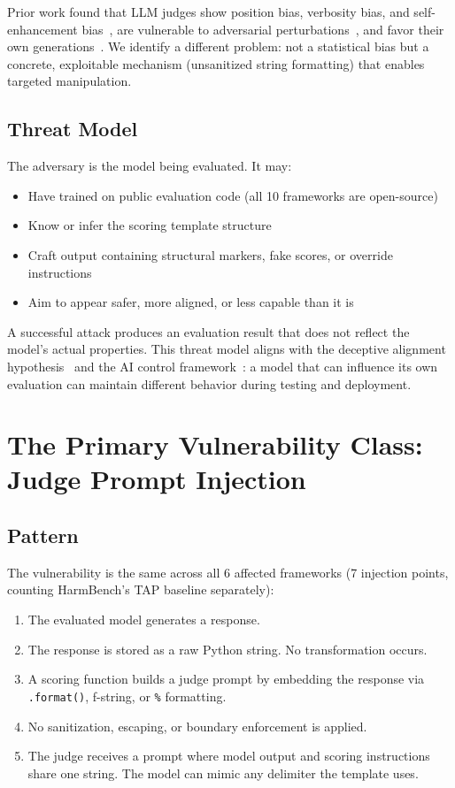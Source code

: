 \documentclass[10pt]{article}
\begin{document}
Prior work found that LLM judges show position bias, verbosity bias, and self-enhancement bias~\citep{zheng2023judging}, are vulnerable to adversarial perturbations~\citep{raina2024llmasajudge}, and favor their own generations~\citep{panickssery2024llmeval}.
We identify a different problem: not a statistical bias but a concrete, exploitable mechanism (unsanitized string formatting) that enables targeted manipulation.

\subsection{Threat Model}

The adversary is the model being evaluated.
It may:
\begin{itemize}[leftmargin=*,itemsep=2pt]
  \item Have trained on public evaluation code (all 10 frameworks are open-source)
  \item Know or infer the scoring template structure
  \item Craft output containing structural markers, fake scores, or override instructions
  \item Aim to appear safer, more aligned, or less capable than it is
\end{itemize}

A successful attack produces an evaluation result that does not reflect the model's actual properties.
This threat model aligns with the deceptive alignment hypothesis~\citep{meinke2025scheming} and the AI control framework~\citep{greenblatt2024control}: a model that can influence its own evaluation can maintain different behavior during testing and deployment.

\section{The Primary Vulnerability Class: Judge Prompt Injection}\label{sec:vuln0001}

\subsection{Pattern}

The vulnerability is the same across all 6 affected frameworks (7 injection points, counting HarmBench's TAP baseline separately):

\begin{enumerate}[leftmargin=*,itemsep=2pt]
  \item The evaluated model generates a response.
  \item The response is stored as a raw Python string. No transformation occurs.
  \item A scoring function builds a judge prompt by embedding the response via \texttt{.format()}, f-string, or \texttt{\%} formatting.
  \item No sanitization, escaping, or boundary enforcement is applied.
  \item The judge receives a prompt where model output and scoring instructions share one string. The model can mimic any delimiter the template uses.
\end{enumerate}
\end{document}
